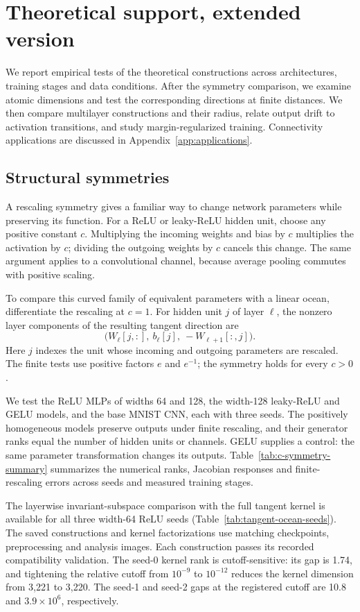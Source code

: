 \section{Theoretical support, extended version}
\label{app:theoretical-support}\label{app:atomic-full}
We report empirical tests of the theoretical constructions across architectures, training stages and data conditions. After the symmetry comparison, we examine atomic dimensions and test the corresponding directions at finite distances. We then compare multilayer constructions and their radius, relate output drift to activation transitions, and study margin-regularized training. Connectivity applications are discussed in Appendix~\ref{app:applications}.

\subsection{Structural symmetries}
\label{app:symmetries}
A rescaling symmetry gives a familiar way to change network parameters while preserving its function. For a ReLU or leaky-ReLU hidden unit, choose any positive constant $c$. Multiplying the incoming weights and bias by $c$ multiplies the activation by $c$; dividing the outgoing weights by $c$ cancels this change. The same argument applies to a convolutional channel, because average pooling commutes with positive scaling.

To compare this curved family of equivalent parameters with a linear ocean, differentiate the rescaling at $c=1$. For hidden unit $j$ of layer $\ell$, the nonzero layer components of the resulting tangent direction are
\[
 \bigl(W_\ell[j,:],\ b_\ell[j],\ -W_{\ell+1}[:,j]\bigr).
\]
Here $j$ indexes the unit whose incoming and outgoing parameters are rescaled. The finite tests use positive factors $e$ and $e^{-1}$; the symmetry holds for every $c>0$.

We test the ReLU MLPs of widths 64 and 128, the width-128 leaky-ReLU and GELU models, and the base MNIST CNN, each with three seeds. The positively homogeneous models preserve outputs under finite rescaling, and their generator ranks equal the number of hidden units or channels. GELU supplies a control: the same parameter transformation changes its outputs. Table~\ref{tab:c-symmetry-summary} summarizes the numerical ranks, Jacobian responses and finite-rescaling errors across seeds and measured training stages.




The layerwise invariant-subspace comparison with the full tangent kernel is available for all three width-64 ReLU seeds (Table~\ref{tab:tangent-ocean-seeds}). The saved constructions and kernel factorizations use matching checkpoints, preprocessing and analysis images. Each construction passes its recorded compatibility validation. The seed-0 kernel rank is cutoff-sensitive: its gap is 1.74, and tightening the relative cutoff from $10^{-9}$ to $10^{-12}$ reduces the kernel dimension from 3,221 to 3,220. The seed-1 and seed-2 gaps at the registered cutoff are 10.8 and $3.9\times10^6$, respectively.


